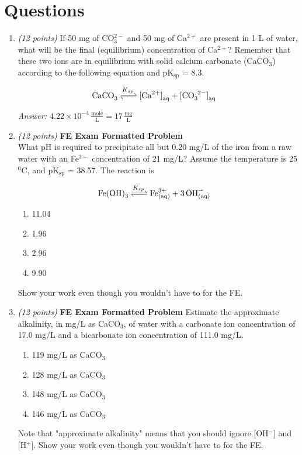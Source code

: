 \documentclass[12pt,letterpaper]{article}
\begin{document}
\section *{Questions}
\begin{enumerate}
\item \emph{(12 points)} If 50 mg of CO$_3^{2-}$ and 50 mg of Ca$^{2+}$ are present in 1 L of water, what will be the final (equilibrium) concentration of Ca$^{2+}$?  Remember that these two ions are in equilibrium with solid calcium carbonate (CaCO$_3$) according to the following equation and $\mathrm{pK_{sp}}$ = 8.3. 

\begin{align*}
\cee{CaCO_3  &<=>[K_{sp}] [Ca^{2+}]_{aq} + [CO_3^{2-}]_{aq}}
\end{align*}

\emph{Answer: $\mathrm{4.22\times 10^{-4} \, \frac{mole}{L} = 17 \, \frac{mg}{L}}$}

\item \emph{(12 points)} \textbf{FE Exam Formatted Problem}\\
What pH is required to precipitate all but 0.20 mg/L of the iron from a raw water with an Fe$^{3+}$ concentration of 21 mg/L?  Assume the temperature is 25 $^0$C, and pK$\mathrm{_{sp}}$ = 38.57.  The reaction is

\begin{align*}
\cee{Fe(OH)_3  &<=>[K_{sp}] Fe^{3+}_{(aq)} + 3OH^-_{(aq)}}
\end{align*}

\begin{enumerate}
\item 11.04
\item 1.96
\item 2.96
\item 9.90
\end{enumerate}

Show your work even though you wouldn't have to for the FE.


\item \emph{(12 points)} \textbf{FE Exam Formatted Problem} Estimate the approximate alkalinity, in mg/L as CaCO$_3$, of water with a carbonate ion concentration of 17.0 mg/L and a bicarbonate ion concentration of 111.0 mg/L. 

\begin{enumerate}
\item 119 mg/L as CaCO$_3$
\item 128 mg/L as CaCO$_3$
\item 148 mg/L as CaCO$_3$
\item 146 mg/L as CaCO$_3$
\end{enumerate}
Note that "approximate alkalinity" means that you should ignore [OH$^-$] and [H$^+$].
Show your work even though you wouldn't have to for the FE.


\end{enumerate}
\end{document}
